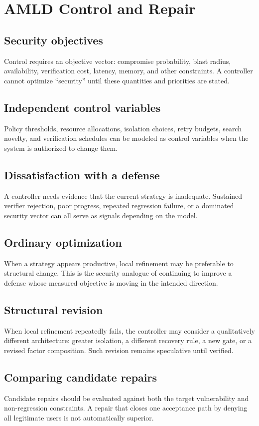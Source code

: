 \documentclass[11pt,oneside]{book}
\theoremstyle{definition}
\theoremstyle{remark}
\begin{document}
\chapter{AMLD Control and Repair}
\label{ch:control-repair}
\section{Security objectives}
Control requires an objective vector: compromise probability, blast radius, availability, verification cost, latency, memory, and other constraints. A controller cannot optimize ``security'' until these quantities and priorities are stated.

\section{Independent control variables}
Policy thresholds, resource allocations, isolation choices, retry budgets, search novelty, and verification schedules can be modeled as control variables when the system is authorized to change them.

\section{Dissatisfaction with a defense}
A controller needs evidence that the current strategy is inadequate. Sustained verifier rejection, poor progress, repeated regression failure, or a dominated security vector can all serve as signals depending on the model.

\section{Ordinary optimization}
When a strategy appears productive, local refinement may be preferable to structural change. This is the security analogue of continuing to improve a defense whose measured objective is moving in the intended direction.

\section{Structural revision}
When local refinement repeatedly fails, the controller may consider a qualitatively different architecture: greater isolation, a different recovery rule, a new gate, or a revised factor composition. Such revision remains speculative until verified.

\section{Comparing candidate repairs}
Candidate repairs should be evaluated against both the target vulnerability and non-regression constraints. A repair that closes one acceptance path by denying all legitimate users is not automatically superior.
\end{document}
